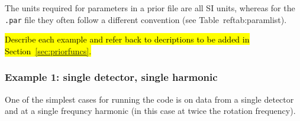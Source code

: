 The units required for parameters in a prior file are all SI units, whereas for the {\tt .par} file they often follow a different
convention (see Table~ref{tab:paramlist}).

\hl{Describe each example and refer back to decriptions to be added in Section~\ref{sec:priorfuncs}.}

\subsubsection{Example 1: single detector, single harmonic}

One of the simplest cases for running the code is on data from a single detector and at a single frequncy harmonic (in this
case at twice the rotation frequency).
